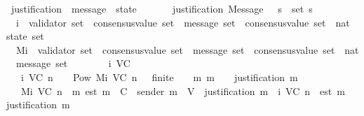 \begin{isabellebody}
\isanewline
{}\isamarkupfalse%
\ justification\ {\isacharcolon}{\isacharcolon}\ {\isachardoublequoteopen}message\ {\isasymRightarrow}\ state{\isachardoublequoteclose}\isanewline
\ \ \isanewline
\ \ \ \ {\isachardoublequoteopen}justification\ {\isacharparenleft}Message\ {\isacharparenleft}{\isacharunderscore}{\isacharcomma}\ {\isacharunderscore}{\isacharcomma}\ s{\isacharparenright}{\isacharparenright}\ {\isacharequal}\ set\ s{\isachardoublequoteclose}\isanewline
\isanewline
\isanewline
{}\isamarkupfalse%
\isanewline
\ \ {\isasymSigma}i\ {\isacharcolon}{\isacharcolon}\ {\isachardoublequoteopen}{\isacharparenleft}validator\ set\ {\isasymtimes}\ consensus{\isacharunderscore}value\ set\ {\isasymtimes}\ {\isacharparenleft}message\ set\ {\isasymRightarrow}\ consensus{\isacharunderscore}value\ set{\isacharparenright}{\isacharparenright}\ {\isasymRightarrow}\ nat\ {\isasymRightarrow}\ state\ set{\isachardoublequoteclose}\ \isanewline
\ \ Mi\ {\isacharcolon}{\isacharcolon}\ {\isachardoublequoteopen}{\isacharparenleft}validator\ set\ {\isasymtimes}\ consensus{\isacharunderscore}value\ set\ {\isasymtimes}\ {\isacharparenleft}message\ set\ {\isasymRightarrow}\ consensus{\isacharunderscore}value\ set{\isacharparenright}{\isacharparenright}\ {\isasymRightarrow}\ nat\ {\isasymRightarrow}\ message\ set{\isachardoublequoteclose}\isanewline
\ \ \ \isanewline
\ \ \ \ {\isachardoublequoteopen}{\isasymSigma}i\ {\isacharparenleft}V{\isacharcomma}C{\isacharcomma}{\isasymepsilon}{\isacharparenright}\ {}\ {\isacharequal}\ {\isacharbraceleft}{\isasymemptyset}{\isacharbraceright}{\isachardoublequoteclose}\isanewline
\ \ {\isacharbar}\ {\isachardoublequoteopen}{\isasymSigma}i\ {\isacharparenleft}V{\isacharcomma}C{\isacharcomma}{\isasymepsilon}{\isacharparenright}\ n\ {\isacharequal}\ {\isacharbraceleft}{\isasymsigma}\ {\isasymin}\ Pow\ {\isacharparenleft}Mi\ {\isacharparenleft}V{\isacharcomma}C{\isacharcomma}{\isasymepsilon}{\isacharparenright}\ {\isacharparenleft}n\ {\isacharminus}\ {}{\isacharparenright}{\isacharparenright}{\isachardot}\ finite\ {\isasymsigma}\ {\isasymand}\ {\isacharparenleft}{\isasymforall}\ m{\isachardot}\ m\ {\isasymin}\ {\isasymsigma}\ {\isasymlongrightarrow}\ justification\ m\ {\isasymsubseteq}\ {\isasymsigma}{\isacharparenright}{\isacharbraceright}{\isachardoublequoteclose}\isanewline
\ \ {\isacharbar}\ {\isachardoublequoteopen}Mi\ {\isacharparenleft}V{\isacharcomma}C{\isacharcomma}{\isasymepsilon}{\isacharparenright}\ n\ {\isacharequal}\ {\isacharbraceleft}m{\isachardot}\ est\ m\ {\isasymin}\ C\ {\isasymand}\ sender\ m\ {\isasymin}\ V\ {\isasymand}\ justification\ m\ {\isasymin}\ {\isacharparenleft}{\isasymSigma}i\ {\isacharparenleft}V{\isacharcomma}C{\isacharcomma}{\isasymepsilon}{\isacharparenright}\ n{\isacharparenright}\ {\isasymand}\ est\ m\ {\isasymin}\ {\isasymepsilon}\ {\isacharparenleft}justification\ m{\isacharparenright}{\isacharbraceright}{\isachardoublequoteclose}\ \isanewline

\end{isabellebody}

